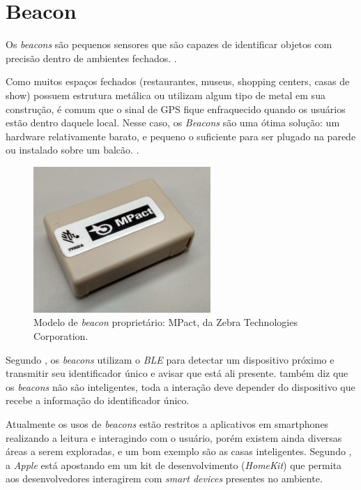 \documentclass[
		12pt,				%
		openright,			%
		oneside,			%
		a4paper,			%
		chapter=TITLE,		%
		english,			%
		brazil				%
	]{abntex2}
\begin{document}
\section{Beacon}\label{sec:beacon}

Os \textit{beacons} são pequenos sensores que são capazes de identificar objetos com precisão dentro de ambientes fechados. \cite{teixeira-beacon}.

\begin{citacao}
Como muitos espaços fechados (restaurantes, museus, shopping centers, casas de show) possuem estrutura metálica ou utilizam algum tipo de metal em sua construção, é comum que o sinal de GPS fique enfraquecido quando os usuários estão dentro daquele local. Nesse caso, os \textit{Beacons} são uma ótima solução: um hardware relativamente barato, e pequeno o suficiente para ser plugado na parede ou instalado sobre um balcão. \cite{teixeira-beacon}.
\end{citacao}

\begin{figure}[htb]
	\caption{\label{fig:beacon-mpact}Modelo de \textit{beacon} proprietário: MPact, da Zebra Technologies Corporation.}
	\begin{center}
		\includegraphics[width=0.6\textwidth]{img/beacon-mpact.jpg}
	\end{center}
\end{figure}

Segundo , os \textit{beacons} utilizam o \textit{BLE} para detectar um dispositivo próximo e transmitir seu identificador único e avisar que está ali presente.  também diz que os \textit{beacons} não são inteligentes, toda a interação deve depender do dispositivo que recebe a informação do identificador único.

Atualmente os usos de \textit{beacons} estão restritos a aplicativos em smartphones realizando a leitura e interagindo com o usuário, porém existem ainda diversas áreas a serem exploradas, e um bom exemplo são as casas inteligentes. Segundo , a \textit{Apple} está apostando em um kit de desenvolvimento (\textit{HomeKit}) que permita aos desenvolvedores interagirem com \textit{smart devices} presentes no ambiente.
\end{document}
